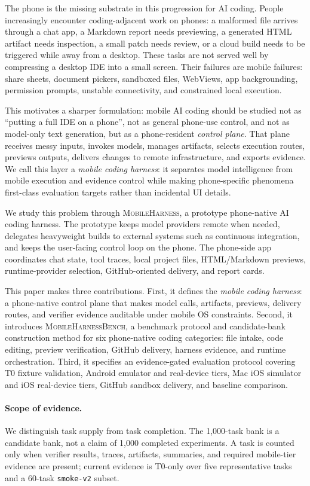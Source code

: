 \documentclass{article}
\newcommand{\mhb}{\textsc{MobileHarnessBench}}
\newcommand{\prototype}{\textsc{MobileHarness}}
\begin{document}
The phone is the missing substrate in this progression for AI coding.
People increasingly encounter coding-adjacent work on phones: a malformed file arrives through a chat app, a Markdown report needs previewing, a generated HTML artifact needs inspection, a small patch needs review, or a cloud build needs to be triggered while away from a desktop.
These tasks are not served well by compressing a desktop IDE into a small screen.
Their failures are mobile failures: share sheets, document pickers, sandboxed files, WebViews, app backgrounding, permission prompts, unstable connectivity, and constrained local execution.

This motivates a sharper formulation: mobile AI coding should be studied not as ``putting a full IDE on a phone'', not as general phone-use control, and not as model-only text generation, but as a phone-resident \emph{control plane}.
That plane receives messy inputs, invokes models, manages artifacts, selects execution routes, previews outputs, delivers changes to remote infrastructure, and exports evidence.
We call this layer a \emph{mobile coding harness}: it separates model intelligence from mobile execution and evidence control while making phone-specific phenomena first-class evaluation targets rather than incidental UI details.

We study this problem through \prototype{}, a prototype phone-native AI coding harness.
The prototype keeps model providers remote when needed, delegates heavyweight builds to external systems such as continuous integration, and keeps the user-facing control loop on the phone.
The phone-side app coordinates chat state, tool traces, local project files, HTML/Markdown previews, runtime-provider selection, GitHub-oriented delivery, and report cards.

This paper makes three contributions.
First, it defines the \emph{mobile coding harness}: a phone-native control plane that makes model calls, artifacts, previews, delivery routes, and verifier evidence auditable under mobile OS constraints.
Second, it introduces \mhb{}, a benchmark protocol and candidate-bank construction method for six phone-native coding categories: file intake, code editing, preview verification, GitHub delivery, harness evidence, and runtime orchestration.
Third, it specifies an evidence-gated evaluation protocol covering T0 fixture validation, Android emulator and real-device tiers, Mac iOS simulator and iOS real-device tiers, GitHub sandbox delivery, and baseline comparison.

\paragraph{Scope of evidence.}
We distinguish task supply from task completion.
The 1,000-task bank is a candidate bank, not a claim of 1,000 completed experiments.
A task is counted only when verifier results, traces, artifacts, summaries, and required mobile-tier evidence are present; current evidence is T0-only over five representative tasks and a 60-task \texttt{smoke-v2} subset.
\end{document}
